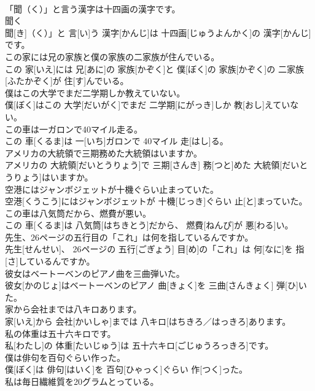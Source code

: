 \documentclass[8pt]{extreport}
\begin{document}
\begin{CJK}{UTF8}{min}
\\	「聞（く）」と言う漢字は十四画の漢字です。	
\\	聞く 
\\	聞[き]（く）」と 言[い]う 漢字[かんじ]は 十四画[じゅうよんかく]の 漢字[かんじ]です。
\\	この家には兄の家族と僕の家族の二家族が住んでいる。	
\\	この 家[いえ]には 兄[あに]の 家族[かぞく]と 僕[ぼく]の 家族[かぞく]の 二家族[ふたかぞく]が 住[す]んでいる。
\\	僕はこの大学でまだ二学期しか教えていない。	
\\	僕[ぼく]はこの 大学[だいがく]でまだ 二学期[にがっき]しか 教[おし]えていない。
\\	この車は一ガロンで40マイル走る。	
\\	この 車[くるま]は 一[いち]ガロンで 40マイル 走[はし]る。
\\	アメリカの大統領で三期務めた大統領はいますか。	
\\	アメリカの 大統領[だいとうりょう]で 三期[さんき] 務[つと]めた 大統領[だいとうりょう]はいますか。
\\	空港にはジャンボジェットが十機ぐらい止まっていた。	
\\	空港[くうこう]にはジャンボジェットが 十機[じっき]ぐらい 止[と]まっていた。
\\	この車は八気筒だから、燃費が悪い。	
\\	この 車[くるま]は 八気筒[はちきとう]だから、 燃費[ねんぴ]が 悪[わる]い。
\\	先生、26ページの五行目の「これ」は何を指しているんですか。	
\\	先生[せんせい]、 26ページの 五行[ごぎょう] 目[め]の「これ」は 何[なに]を 指[さ]しているんですか。
\\	彼女はベートーベンのピアノ曲を三曲弾いた。	
\\	彼女[かのじょ]はベートーベンのピアノ 曲[きょく]を 三曲[さんきょく] 弾[ひ]いた。
\\	家から会社までは八キロあります。	
\\	家[いえ]から 会社[かいしゃ]までは 八キロ[はちきろ／はっきろ]あります。
\\	私の体重は五十六キロです。	
\\	私[わたし]の 体重[たいじゅう]は 五十六キロ[ごじゅうろっきろ]です。
\\	僕は俳句を百句ぐらい作った。	
\\	僕[ぼく]は 俳句[はいく]を 百句[ひゃっく]ぐらい 作[つく]った。
\\	私は毎日繊維質を20グラムとっている。	

\end{CJK}
\end{document}
